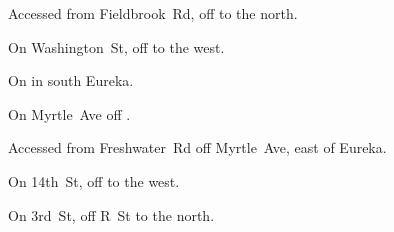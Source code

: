 
\begin{LocationList}

Accessed from Fieldbrook~Rd, off  to the north.

On Washington~St, off  to the west.

On  in south Eureka.

\Location{\GasStation \Gas \Rest \Service}
On Myrtle~Ave off .

Accessed from Freshwater~Rd off Myrtle~Ave, east of Eureka.

On 14th~St, off  to the west.

On 3rd~St, off  R~St to the north.

\end{LocationList}
